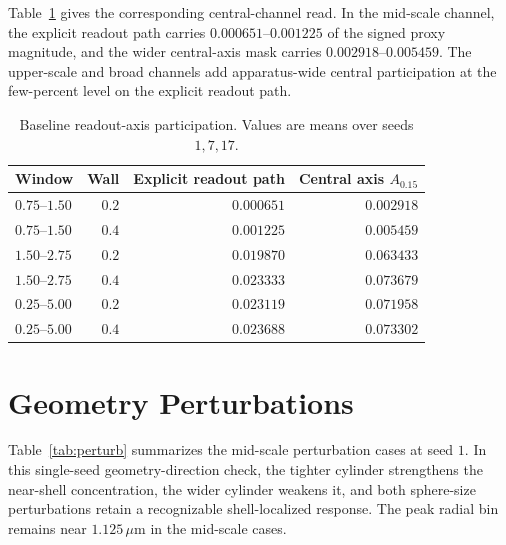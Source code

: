 \documentclass[11pt]{article}
\newcommand{\um}{\,\mu\mathrm{m}}
\begin{document}
Table~\ref{tab:readout} gives the corresponding central-channel read. In the
mid-scale channel, the explicit readout path carries $0.000651$--$0.001225$ of
the signed proxy magnitude, and the wider central-axis mask carries
$0.002918$--$0.005459$. The upper-scale and broad channels add apparatus-wide
central participation at the few-percent level on the explicit readout path.

\begin{table}[htbp]
\centering
\caption{Baseline readout-axis participation. Values are means over seeds $1,7,17$.}
\label{tab:readout}
\small
\begin{tabular}{lrrr}
\toprule
Window & Wall & Explicit readout path & Central axis $A_{0.15}$ \\
\midrule
$0.75$--$1.50$ & $0.2$ & $0.000651$ & $0.002918$ \\
$0.75$--$1.50$ & $0.4$ & $0.001225$ & $0.005459$ \\
$1.50$--$2.75$ & $0.2$ & $0.019870$ & $0.063433$ \\
$1.50$--$2.75$ & $0.4$ & $0.023333$ & $0.073679$ \\
$0.25$--$5.00$ & $0.2$ & $0.023119$ & $0.071958$ \\
$0.25$--$5.00$ & $0.4$ & $0.023688$ & $0.073302$ \\
\bottomrule
\end{tabular}
\end{table}

\section{Geometry Perturbations}

Table~\ref{tab:perturb} summarizes the mid-scale perturbation cases at seed
$1$. In this single-seed geometry-direction check, the tighter cylinder
strengthens the near-shell concentration, the wider cylinder weakens it, and
both sphere-size perturbations retain a recognizable shell-localized response.
The peak radial bin remains near $1.125\um$ in the mid-scale cases.
\end{document}
